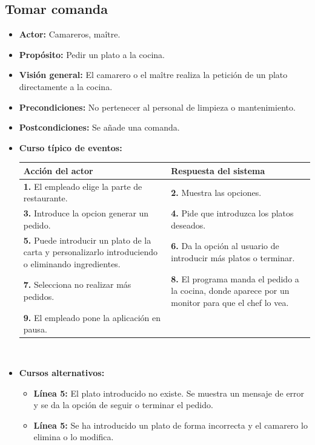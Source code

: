 \documentclass[spanish,a4paper,11pt, twoside]{report}	%
\begin{document}

		\subsection{Tomar comanda}
			\begin{itemize}
			\item \textbf{Actor:} Camareros, maître.
			\item \textbf{Propósito: } Pedir un plato a la cocina.
			\item \textbf{Visión general:} El camarero o el maître realiza la petición de un plato directamente a la cocina.
			\item \textbf{Precondiciones:} No pertenecer al personal de limpieza o mantenimiento.
			\item \textbf{Postcondiciones:} Se añade una comanda.
			\item \textbf{Curso típico de eventos:} 	\\
				\begin{tabular}{|p{6cm}||p{6cm}|}
				\hline
				\textbf{Acción del actor} & \textbf{Respuesta del sistema} \\ \hline \hline
				\textbf{1.} El empleado elige la parte de restaurante. & \textbf{2.} Muestra las opciones.\\ \hline 
				\textbf{3.} Introduce la opcion generar un pedido. & \textbf{4.} Pide que introduzca los platos deseados. \\ \hline
				\textbf{5.} Puede introducir un plato de la carta y personalizarlo introduciendo o eliminando ingredientes. & \textbf{6.} Da la opción al usuario de introducir más platos o terminar. \\ \hline
				\textbf{7.} Selecciona no realizar más pedidos.	& \textbf{8.} El programa manda el pedido a la cocina, donde aparece por un monitor para que el chef lo vea. \\ \hline
				\textbf{9.} El empleado pone la aplicación en pausa. & \\ \hline
			\end{tabular}
			\\
			\item \textbf{Cursos alternativos:} 
			\begin{itemize}
			\item  \textbf{Línea 5:} El plato introducido no existe. Se muestra un mensaje de error y se da la opción de seguir o terminar el pedido.
			\item  \textbf{Línea 5:} Se ha introducido un plato de forma incorrecta y el camarero lo elimina o lo modifica.
			\end {itemize}
		\end {itemize}
		
\end{document}
